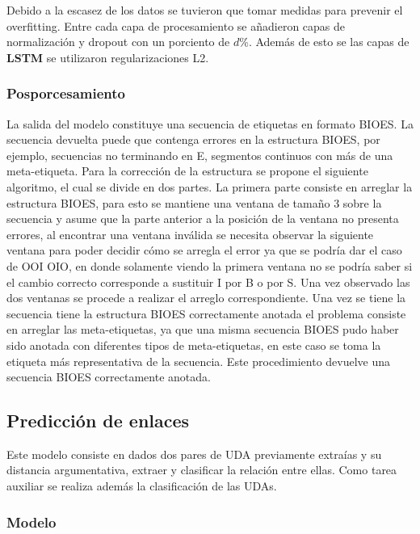 Debido a la escasez de los datos se tuvieron que tomar medidas para prevenir el overfitting. Entre cada capa de 
procesamiento se añadieron capas de normalización y dropout con un porciento de $d$\%. Además de esto se 
las capas de \textbf{LSTM} se utilizaron regularizaciones L2.

\subsubsection{Posporcesamiento}

La salida del modelo constituye una secuencia de etiquetas en formato BIOES. La secuencia devuelta puede que contenga
errores en la estructura BIOES, por ejemplo, secuencias no terminando en E, segmentos continuos con más de una meta-etiqueta.
Para la corrección de la estructura se propone el siguiente algoritmo, el cual se divide en dos partes. La primera
parte consiste en arreglar la estructura BIOES, para esto se mantiene una ventana de tamaño
3 sobre la secuencia y asume que la parte anterior a la posición de la ventana no presenta errores, al encontrar una
ventana inválida se necesita observar la siguiente ventana para poder decidir cómo se arregla el error ya que se
podría dar el caso de OOI OIO, en donde solamente viendo la primera ventana no se podría saber si el cambio 
correcto corresponde a sustituir I por B o por S. Una vez observado las dos ventanas se procede a realizar el 
arreglo correspondiente. Una vez se tiene la secuencia tiene la estructura BIOES correctamente anotada el problema
consiste en arreglar las meta-etiquetas, ya que una misma secuencia BIOES pudo haber sido anotada con diferentes
tipos de meta-etiquetas, en este caso se toma la etiqueta más representativa de la secuencia. Este procedimiento
devuelve una secuencia BIOES correctamente anotada.

\subsection{Predicción de enlaces}

Este modelo consiste en dados dos pares de UDA previamente extraías y su distancia argumentativa, 
extraer y clasificar la relación entre ellas. Como tarea auxiliar se realiza además la clasificación 
de las UDAs.

\subsubsection{Modelo}

